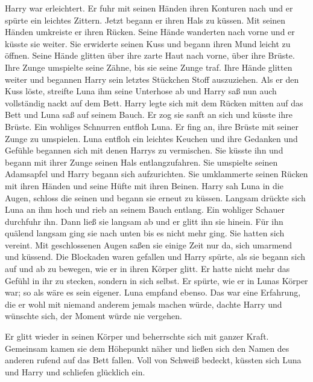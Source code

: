 \begin{abAchtzehn}
Harry war erleichtert. Er fuhr mit seinen Händen ihren Konturen nach und er spürte ein leichtes Zittern. Jetzt begann er ihren Hals zu küssen. Mit seinen Händen umkreiste er ihren Rücken. Seine Hände wanderten nach vorne und er küsste sie weiter. Sie erwiderte seinen Kuss und begann ihren Mund leicht zu öffnen. Seine Hände glitten über ihre zarte Haut nach vorne, über ihre Brüste. Ihre Zunge umspielte seine Zähne, bis sie seine Zunge traf. Ihre Hände glitten weiter und begannen Harry sein letztes Stückchen Stoff auszuziehen. Als er den Kuss löste, streifte Luna ihm seine Unterhose ab und Harry saß nun auch vollständig nackt auf dem Bett. Harry legte sich mit dem Rücken mitten auf das Bett und Luna saß auf seinem Bauch. Er zog sie sanft an sich und küsste ihre Brüste. Ein wohliges Schnurren entfloh Luna. Er fing an, ihre Brüste mit seiner Zunge zu umspielen. Luna entfloh ein leichtes Keuchen und ihre Gedanken und Gefühle begannen sich mit denen Harrys zu vermischen. Sie küsste ihn und begann mit ihrer Zunge seinen Hals entlangzufahren. Sie umspielte seinen Adamsapfel und Harry begann sich aufzurichten. Sie umklammerte seinen Rücken mit ihren Händen und seine Hüfte mit ihren Beinen. Harry sah Luna in die Augen, schloss die seinen und begann sie erneut zu küssen. Langsam drückte sich Luna an ihm hoch und rieb an seinem Bauch entlang. Ein wohliger Schauer durchfuhr ihn. Dann ließ sie langsam ab und er glitt ihn sie hinein. Für ihn quälend langsam ging sie nach unten bis es nicht mehr ging. Sie hatten sich vereint. Mit geschlossenen Augen saßen sie einige Zeit nur da, sich umarmend und küssend. Die Blockaden waren gefallen und Harry spürte, als sie begann sich auf und ab zu bewegen, wie er in ihren Körper glitt. Er hatte nicht mehr das Gefühl in ihr zu stecken, sondern in sich selbst. Er spürte, wie er in Lunas Körper war; so als wäre es sein eigener. Luna empfand ebenso. Das war eine Erfahrung, die er wohl mit niemand anderem jemals machen würde, dachte Harry und wünschte sich, der Moment würde nie vergehen.

Er glitt wieder in seinen Körper und beherrschte sich mit ganzer Kraft. Gemeinsam kamen sie dem Höhepunkt näher und ließen sich den Namen des anderen rufend auf das Bett fallen. Voll von Schweiß bedeckt, küssten sich Luna und Harry und schliefen glücklich ein.

\end{abAchtzehn}

\begin{safedivide}
\fskdivider
\end{safedivide}

